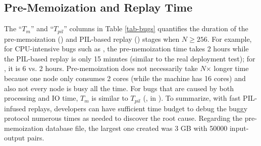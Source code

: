 

\subsection{Pre-Memoization and Replay Time}
\label{eval-mem}



The ``$T_m$'' and ``$T_{pil}$'' columns in Table \ref{tab-bugs} quantifies
the duration of the pre-memoization (\stestm) and PIL-based replay (\stestp)
stages when $N$$\geq$$256$.
%
For example, for CPU-intensive bugs such as \caone, the pre-memoization
time takes 2 hours while the PIL-based replay is only 15 minutes (similar
to the real deployment test); for \riakone, it is 6 vs. 2 hours.
%
Pre-memoization does not necessarily take $N$$\times$ longer time because
one node only consumes 2 cores (while the machine has 16 cores) and also
not every node is busy all the time.
%
For bugs that are caused by both processing and IO time, $T_m$ is similar
to $T_{pil}$ (\eg, in \catwo).
%
To summarize, with fast PIL-infused replays, developers can have 
sufficient time budget to debug the buggy protocol numerous times as needed to
discover the root cause.
%
Regarding the pre-memoization database file, the largest one created was
3 GB with 50000 input-output pairs.


% 


